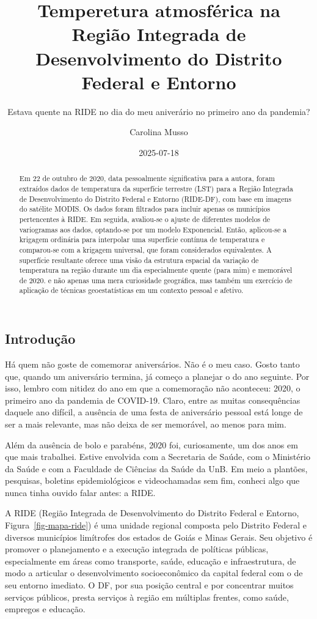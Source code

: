 \documentclass[
  letterpaper,
  DIV=11,
  numbers=noendperiod]{scrartcl}
\title{Temperetura atmosférica na Região Integrada de Desenvolvimento do
Distrito Federal e Entorno}
\subtitle{Estava quente na RIDE no dia do meu aniverário no primeiro ano
da pandemia?}
\author{Carolina Musso}
\date{2025-07-18}
\begin{document}
\maketitle
\begin{abstract}
Em 22 de outubro de 2020, data pessoalmente significativa para a autora,
foram extraídos dados de temperatura da superfície terrestre (LST) para
a Região Integrada de Desenvolvimento do Distrito Federal e Entorno
(RIDE-DF), com base em imagens do satélite MODIS. Os dados foram
filtrados para incluir apenas os municípios pertencentes à RIDE. Em
seguida, avaliou-se o ajuste de diferentes modelos de variogramas aos
dados, optando-se por um modelo Exponencial. Então, aplicou-se a
krigagem ordinária para interpolar uma superfície contínua de
temperatura e comparou-se com a krigagem universal, que foram
considerados equivalentes. A superfície resultante oferece uma visão da
estrutura espacial da variação de temperatura na região durante um dia
especialmente quente (para mim) e memorável de 2020. e não apenas uma
mera curiosidade geográfica, mas também um exercício de aplicação de
técnicas geoestatísticas em um contexto pessoal e afetivo.
\end{abstract}

\subsection{Introdução}\label{introduuxe7uxe3o}

Há quem não goste de comemorar aniversários. Não é o meu caso. Gosto
tanto que, quando um aniversário termina, já começo a planejar o do ano
seguinte. Por isso, lembro com nitidez do ano em que a comemoração não
aconteceu: 2020, o primeiro ano da pandemia de COVID-19. Claro, entre as
muitas consequências daquele ano difícil, a ausência de uma festa de
aniversário pessoal está longe de ser a mais relevante, mas não deixa de
ser memorável, ao menos para mim.

Além da ausência de bolo e parabéns, 2020 foi, curiosamente, um dos anos
em que mais trabalhei. Estive envolvida com a Secretaria de Saúde, com o
Ministério da Saúde e com a Faculdade de Ciências da Saúde da UnB. Em
meio a plantões, pesquisas, boletins epidemiológicos e videochamadas sem
fim, conheci algo que nunca tinha ouvido falar antes: a RIDE.

A RIDE (Região Integrada de Desenvolvimento do Distrito Federal e
Entorno, Figura~\ref{fig-mapa-ride}) é uma unidade regional composta
pelo Distrito Federal e diversos municípios limítrofes dos estados de
Goiás e Minas Gerais. Seu objetivo é promover o planejamento e a
execução integrada de políticas públicas, especialmente em áreas como
transporte, saúde, educação e infraestrutura, de modo a articular o
desenvolvimento socioeconômico da capital federal com o de seu entorno
imediato. O DF, por sua posição central e por concentrar muitos serviços
públicos, presta serviços à região em múltiplas frentes, como saúde,
empregos e educação.
\end{document}
